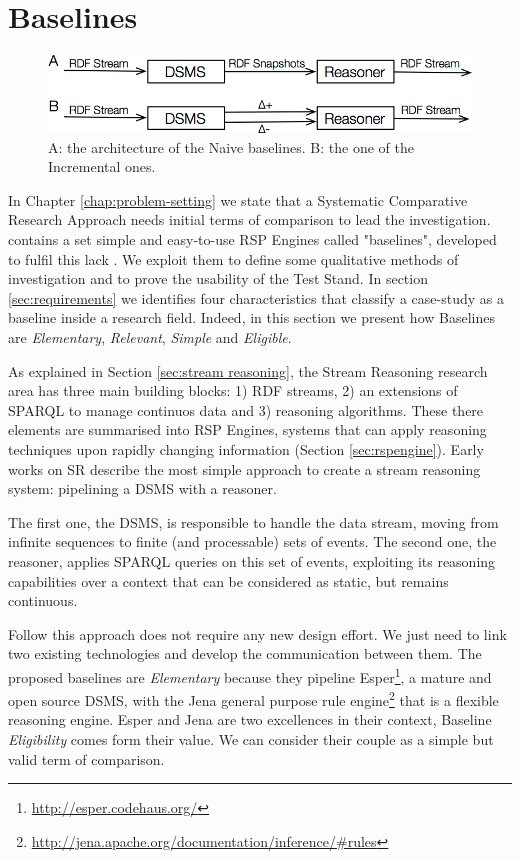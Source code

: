 \section{Baselines}
\label{sec:baselines}

\begin{figure}[tbh]
  \centering
	\includegraphics[width=\linewidth]{images/baselines-final}
	\caption{A: the architecture of the Naive baselines. B: the one of  the Incremental ones.} 
  	\label{fig:baselines}
\end{figure}

In Chapter \ref{chap:problem-setting} we state that a Systematic Comparative Research Approach needs initial terms of comparison to lead the investigation. \name contains a set simple and easy-to-use RSP Engines called "baselines", developed to fulfil this lack . 
We exploit them to define some qualitative methods of investigation and to prove the usability of the Test Stand. In section \ref{sec:requirements} we identifies four characteristics that classify a case-study as a baseline inside a research field. Indeed, in this section we present how \name Baselines are \textit{Elementary}, \textit{Relevant}, \textit{Simple} and \textit{Eligible}.

As explained in Section \ref{sec:stream reasoning}, the Stream Reasoning research area has three main building blocks: 1) RDF streams, 2) an extensions of SPARQL to manage continuos data and 3) reasoning algorithms. These there elements are summarised into RSP Engines, systems that can apply reasoning techniques upon rapidly changing information (Section \ref{sec:rspengine}). Early works on SR \cite{DBLP:conf/fis/ValleCBBC08,Walavalkar08streamingknowledge} describe the most simple approach to create a stream reasoning system: pipelining a DSMS with a reasoner. 

The first one, the DSMS, is responsible to handle the data stream, moving from infinite sequences to finite (and processable) sets of events. The second one, the reasoner, applies SPARQL queries on this set of events, exploiting its reasoning capabilities over a context that can be considered as static, but remains continuous. 

Follow this approach does not require any new design effort. We just need to link two existing technologies and develop the communication between them. The proposed baselines are \textit{Elementary} because they pipeline Esper\footnote{\url{http://esper.codehaus.org/}}, a mature and open source DSMS, with the Jena general purpose rule engine\footnote{\url{http://jena.apache.org/documentation/inference/#rules}} that is a flexible reasoning engine.  Esper and Jena are two excellences in their context, Baseline \textit{Eligibility} comes form their value. We can consider their couple as a simple but valid term of comparison.

